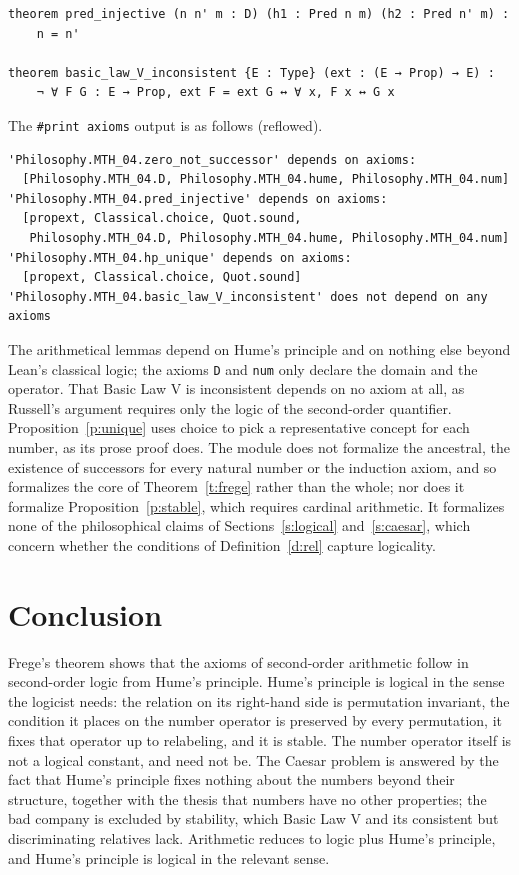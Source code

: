 \documentclass{situationist-preprint}
\begin{document}
\begin{lstlisting}
theorem pred_injective (n n' m : D) (h1 : Pred n m) (h2 : Pred n' m) :
    n = n'

theorem basic_law_V_inconsistent {E : Type} (ext : (E → Prop) → E) :
    ¬ ∀ F G : E → Prop, ext F = ext G ↔ ∀ x, F x ↔ G x
\end{lstlisting}

The \texttt{\#print axioms} output is as follows (reflowed).

\begin{lstlisting}
'Philosophy.MTH_04.zero_not_successor' depends on axioms:
  [Philosophy.MTH_04.D, Philosophy.MTH_04.hume, Philosophy.MTH_04.num]
'Philosophy.MTH_04.pred_injective' depends on axioms:
  [propext, Classical.choice, Quot.sound,
   Philosophy.MTH_04.D, Philosophy.MTH_04.hume, Philosophy.MTH_04.num]
'Philosophy.MTH_04.hp_unique' depends on axioms:
  [propext, Classical.choice, Quot.sound]
'Philosophy.MTH_04.basic_law_V_inconsistent' does not depend on any axioms
\end{lstlisting}

The arithmetical lemmas depend on Hume's principle and on nothing else beyond Lean's classical logic; the axioms \texttt{D} and \texttt{num} only declare the domain and the operator. That Basic Law V is inconsistent depends on no axiom at all, as Russell's argument requires only the logic of the second-order quantifier. Proposition~\ref{p:unique} uses choice to pick a representative concept for each number, as its prose proof does. The module does not formalize the ancestral, the existence of successors for every natural number or the induction axiom, and so formalizes the core of Theorem~\ref{t:frege} rather than the whole; nor does it formalize Proposition~\ref{p:stable}, which requires cardinal arithmetic. It formalizes none of the philosophical claims of Sections~\ref{s:logical} and~\ref{s:caesar}, which concern whether the conditions of Definition~\ref{d:rel} capture logicality.

\section{Conclusion}

Frege's theorem shows that the axioms of second-order arithmetic follow in second-order logic from Hume's principle. Hume's principle is logical in the sense the logicist needs: the relation on its right-hand side is permutation invariant, the condition it places on the number operator is preserved by every permutation, it fixes that operator up to relabeling, and it is stable. The number operator itself is not a logical constant, and need not be. The Caesar problem is answered by the fact that Hume's principle fixes nothing about the numbers beyond their structure, together with the thesis that numbers have no other properties; the bad company is excluded by stability, which Basic Law V and its consistent but discriminating relatives lack. Arithmetic reduces to logic plus Hume's principle, and Hume's principle is logical in the relevant sense.
\end{document}
